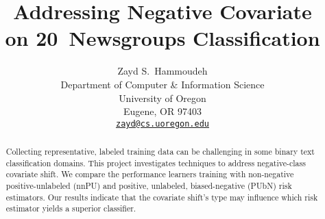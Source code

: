 \documentclass{article}
\title{Addressing Negative Covariate \\ on 20~Newsgroups Classification}
\author{%
  Zayd S.\ Hammoudeh \\
  Department of Computer \& Information Science \\
  University of Oregon \\
  Eugene, OR 97403 \\
  \texttt{\href{mailto:zayd@cs.uoregon.edu}{zayd@cs.uoregon.edu}}
}
\begin{document}
\maketitle

\begin{abstract}
  Collecting representative, labeled training data can be challenging in some binary text classification domains. This project investigates techniques to address negative-class covariate shift.  We compare the performance learners training with non-negative positive-unlabeled (nnPU) and positive, unlabeled, biased-negative (PUbN) risk estimators. Our results indicate that the covariate shift's type may influence which risk estimator yields a superior classifier.
\end{abstract}


% 
% 




% 



\end{document}
